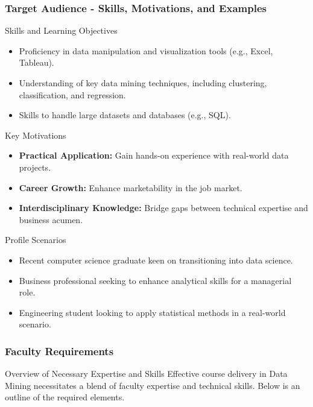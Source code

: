 \documentclass[aspectratio=169]{beamer}
\begin{document}
\begin{frame}[fragile]
  \frametitle{Target Audience - Skills, Motivations, and Examples}
  \begin{block}{Skills and Learning Objectives}
    \begin{itemize}
      \item Proficiency in data manipulation and visualization tools (e.g., Excel, Tableau).
      \item Understanding of key data mining techniques, including clustering, classification, and regression.
      \item Skills to handle large datasets and databases (e.g., SQL).
    \end{itemize}
  \end{block}

  \begin{block}{Key Motivations}
    \begin{itemize}
      \item \textbf{Practical Application:} Gain hands-on experience with real-world data projects.
      \item \textbf{Career Growth:} Enhance marketability in the job market.
      \item \textbf{Interdisciplinary Knowledge:} Bridge gaps between technical expertise and business acumen.
    \end{itemize}
  \end{block}
  
  \begin{block}{Profile Scenarios}
    \begin{itemize}
      \item Recent computer science graduate keen on transitioning into data science.
      \item Business professional seeking to enhance analytical skills for a managerial role.
      \item Engineering student looking to apply statistical methods in a real-world scenario.
    \end{itemize}
  \end{block}
\end{frame}

\begin{frame}
    \frametitle{Faculty Requirements}
    \begin{block}{Overview of Necessary Expertise and Skills}
        Effective course delivery in Data Mining necessitates a blend of faculty expertise and technical skills. Below is an outline of the required elements.
    \end{block}
\end{frame}
\end{document}
